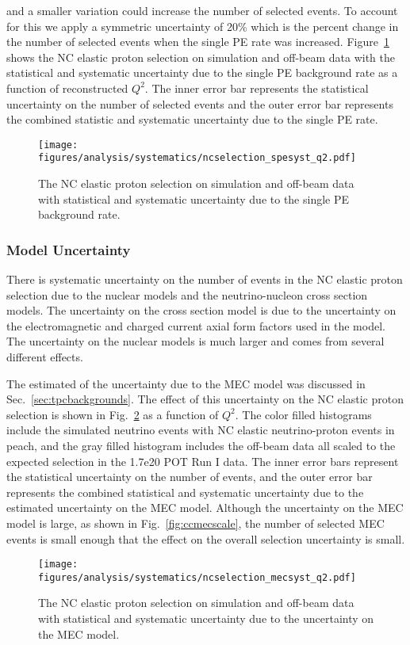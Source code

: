     and a smaller variation could increase the number of selected events. To
    account for this we apply a symmetric uncertainty of 20\% which is the
    percent change in the number of selected events when the single PE rate was
    increased. Figure~\ref{fig:systspe} shows the NC elastic proton selection
    on simulation and off-beam data with the statistical and systematic
    uncertainty due to the single PE background rate as a function of
    reconstructed $Q^2$. The inner error bar represents the statistical
    uncertainty on the number of selected events and the outer error bar
    represents the combined statistic and systematic uncertainty due to the
    single PE rate.
    \begin{figure}[ht]
      \centering
      \texttt{[image: figures/analysis/systematics/ncselection\_spesyst\_q2.pdf]}
      \caption{The NC elastic proton selection on simulation and off-beam data
      with statistical and systematic uncertainty due to the single PE
      background rate.}
      \label{fig:systspe}
    \end{figure}

  \subsubsection{Model Uncertainty}\label{sec:modeluncertainty}
    There is systematic uncertainty on the number of events in the NC elastic
    proton selection due to the nuclear models and the neutrino-nucleon cross
    section models. The uncertainty on the cross section model is due to the
    uncertainty on the electromagnetic and charged current axial form factors
    used in the model. The uncertainty on the nuclear models is much larger and
    comes from several different effects.

    The estimated of the uncertainty due to the MEC model was discussed in
    Sec.~\ref{sec:tpcbackgrounds}. The effect of this uncertainty on the NC
    elastic proton selection is shown in Fig.~\ref{fig:systmec} as a function
    of $Q^2$. The color filled histograms include the simulated neutrino events
    with NC elastic neutrino-proton events in peach, and the gray filled
    histogram includes the off-beam data all scaled to the expected selection
    in the 1.7e20 POT Run I data. The inner error bars represent the
    statistical uncertainty on the number of events, and the outer error bar
    represents the combined statistical and systematic uncertainty due to the
    estimated uncertainty on the MEC model. Although the uncertainty on the MEC
    model is large, as shown in Fig.~\ref{fig:ccmecscale}, the number of
    selected MEC events is small enough that the effect on the overall
    selection uncertainty is small.
    \begin{figure}[ht]
      \centering
      \texttt{[image: figures/analysis/systematics/ncselection\_mecsyst\_q2.pdf]}
      \caption{The NC elastic proton selection on simulation and off-beam data
      with statistical and systematic uncertainty due to the uncertainty on the
      MEC model.}
      \label{fig:systmec}
    \end{figure}


